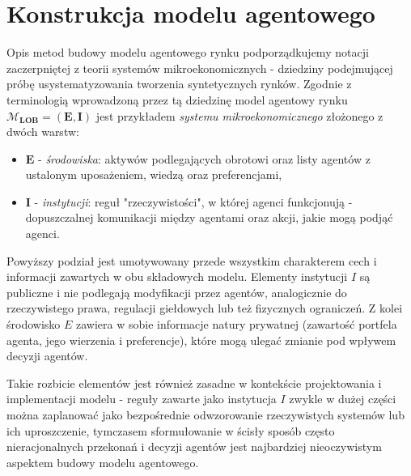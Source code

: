 \chapter{Konstrukcja modelu agentowego}\label{sec:theoreticalmodel}
Opis metod budowy modelu agentowego rynku podporządkujemy notacji zaczerpniętej z teorii systemów mikroekonomicznych \cite{smith82} - dziedziny podejmującej próbę usystematyzowania tworzenia syntetycznych rynków. Zgodnie z terminologią wprowadzoną przez tą dziedzinę model agentowy rynku $\mathcal{M}_{\mathbf{LOB}} = (\mathbf{E}, \mathbf{I})$ jest przykładem \textit{systemu mikroekonomicznego} złożonego z dwóch warstw:
\begin{itemize}
\item $\mathbf{E}$ - \textit{środowiska}: aktywów podlegających obrotowi oraz listy agentów z ustalonym uposażeniem, wiedzą oraz preferencjami,
\item  $\mathbf{I}$ - \textit{instytucji}: reguł "rzeczywistości", w której agenci funkcjonują - dopuszczalnej komunikacji między agentami oraz akcji, jakie mogą podjąć agenci.
\end{itemize}

Powyższy podział jest umotywowany przede wszystkim charakterem cech i informacji zawartych w obu składowych modelu. Elementy instytucji $I$ są publiczne i nie podlegają modyfikacji przez agentów, analogicznie do rzeczywistego prawa, regulacji giełdowych lub też fizycznych ograniczeń. Z kolei środowisko $E$ zawiera w sobie informacje natury prywatnej (zawartość portfela agenta, jego wierzenia i preferencje), które mogą ulegać zmianie pod wpływem decyzji agentów. 

Takie rozbicie elementów jest również zasadne w kontekście projektowania i implementacji modelu - reguły zawarte jako instytucja $I$ zwykle w dużej części można zaplanować jako bezpośrednie odwzorowanie rzeczywistych systemów lub ich uproszczenie, tymczasem sformułowanie w ścisły sposób często nieracjonalnych przekonań i decyzji agentów jest najbardziej nieoczywistym aspektem budowy modelu agentowego.  


